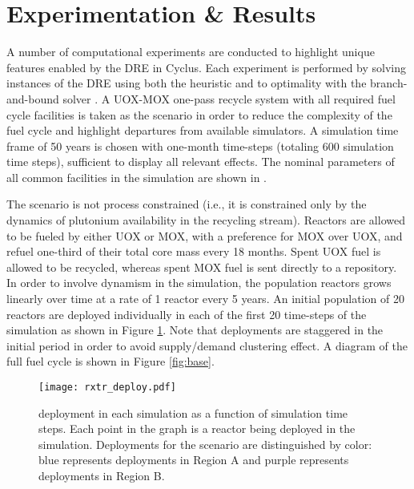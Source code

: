 \section{Experimentation \& Results}\label{sec:results}


A number of computational experiments are conducted to highlight unique features
enabled by the DRE in Cyclus. Each experiment is performed by solving instances
of the DRE using both the \greedy heuristic and to optimality with the
branch-and-bound solver \cbc. A UOX-MOX one-pass recycle system with all
required fuel cycle facilities is taken as the \basecase scenario in order to
reduce the complexity of the fuel cycle and highlight departures from available
simulators. A simulation time frame of 50 years is chosen with one-month
time-steps (totaling 600 simulation time steps), sufficient to display all
relevant effects. The nominal parameters of all common facilities in the
simulation are shown in \cite{gidden_dre_2016}.

The \basecase scenario is not process constrained (i.e., it is constrained only
by the dynamics of plutonium availability in the recycling stream). Reactors are
allowed to be fueled by either UOX or MOX, with a preference for MOX over UOX,
and refuel one-third of their total core mass every 18 months. Spent UOX fuel is
allowed to be recycled, whereas spent MOX fuel is sent directly to a
repository. In order to involve dynamism in the simulation, the population
reactors grows linearly over time at a rate of 1 reactor every 5 years. An
initial population of 20 reactors are deployed individually in each of the first
20 time-steps of the simulation as shown in Figure \ref{fig:deploy}. Note that
deployments are staggered in the initial period in order to avoid supply/demand
clustering effect. A diagram of the full \basecase fuel cycle is shown in Figure
\ref{fig:base}.

\begin{figure}
  \begin{center}
    \texttt{[image: rxtr\_deploy.pdf]}
    \caption[]{
      \label{fig:deploy}
      \reactor deployment in each simulation as a function of simulation time
      steps. Each point in the graph is a reactor being deployed in the
      simulation. Deployments for the \tariff scenario are distinguished by
      color: blue represents deployments in Region A and purple represents
      deployments in Region B.}
  \end{center}
\end{figure}

